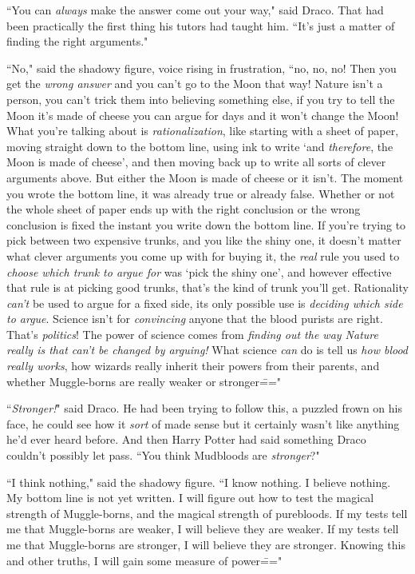 ``You can \emph{always} make the answer come out your way," said Draco. That had been practically the first thing his tutors had taught him. ``It's just a matter of finding the right arguments."

``No," said the shadowy figure, voice rising in frustration, ``no, no, no! Then you get the \emph{wrong answer} and you can't go to the Moon that way! Nature isn't a person, you can't trick them into believing something else, if you try to tell the Moon it's made of cheese you can argue for days and it won't change the Moon! What you're talking about is \emph{rationalization}, like starting with a sheet of paper, moving straight down to the bottom line, using ink to write `and \emph{therefore}, the Moon is made of cheese', and then moving back up to write all sorts of clever arguments above. But either the Moon is made of cheese or it isn't. The moment you wrote the bottom line, it was already true or already false. Whether or not the whole sheet of paper ends up with the right conclusion or the wrong conclusion is fixed the instant you write down the bottom line. If you're trying to pick between two expensive trunks, and you like the shiny one, it doesn't matter what clever arguments you come up with for buying it, the \emph{real} rule you used to \emph{choose which trunk to argue for} was `pick the shiny one', and however effective that rule is at picking good trunks, that's the kind of trunk you'll get. Rationality \emph{can't} be used to argue for a fixed side, its only possible use is \emph{deciding which side to argue}. Science isn't for \emph{convincing} anyone that the blood purists are right. That's \emph{politics}! The power of science comes from \emph{finding out the way Nature really is that can't be changed by arguing!} What science \emph{can} do is tell us \emph{how blood really works}, how wizards really inherit their powers from their parents, and whether Muggle-borns are really weaker or stronger\==="

``\emph{Stronger!}" said Draco. He had been trying to follow this, a puzzled frown on his face, he could see how it \emph{sort} of made sense but it certainly wasn't like anything he'd ever heard before. And then Harry Potter had said something Draco couldn't possibly let pass. ``You think Mudbloods are \emph{stronger}?"

``I think nothing," said the shadowy figure. ``I know nothing. I believe nothing. My bottom line is not yet written. I will figure out how to test the magical strength of Muggle-borns, and the magical strength of purebloods. If my tests tell me that Muggle-borns are weaker, I will believe they are weaker. If my tests tell me that Muggle-borns are stronger, I will believe they are stronger. Knowing this and other truths, I will gain some measure of power\==="

